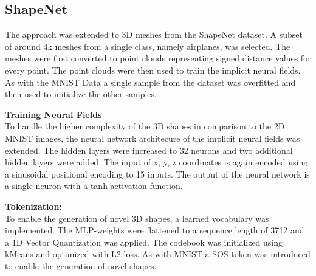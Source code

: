 \subsection*{ShapeNet}

The approach was extended to 3D meshes from the ShapeNet dataset. A subset of around 4k meshes from a single class, namely airplanes, was selected. The meshes were first converted to point clouds representing signed distance values for every point. The point clouds were then used to train the implicit neural fields. As with the MNIST Data a single sample from the dataset was overfitted and then used to initialize the other samples.
\vspace{1em}

\noindent
\textbf{Training Neural Fields}\\
To handle the higher complexity of the 3D shapes in comparison to the 2D MNIST images, the neural network architecure of the implicit neural fields was extended. The hidden layers were increased to 32 neurons and two additional hidden layers were added. The input of x, y, z coordinates is again encoded using a sinusoidal positional encoding to 15 inputs. The output of the neural network is a single neuron with a tanh activation function.




\vspace{1em}

\noindent
\textbf{Tokenization:}\\
To enable the generation of novel 3D shapes, a learned vocabulary was implemented. The MLP-weights were flattened to a sequence length of 3712 and a 1D Vector Quantization was applied. The codebook was initialized using kMeans and optimized with L2 loss. As with MNIST a SOS token was introduced to enable the generation of novel shapes.
\vspace{1em}

